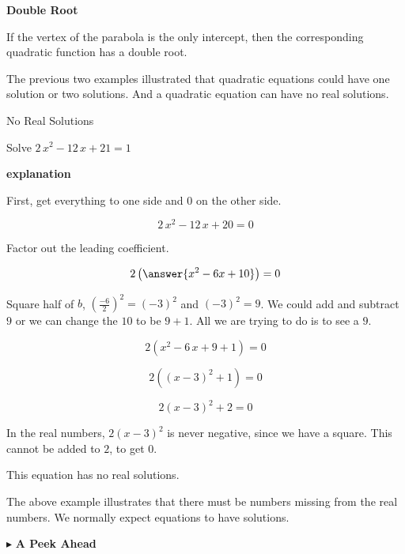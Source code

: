 \documentclass{ximera}
\begin{document}
\begin{idea} \textbf{\textcolor{blue!55!black}{Double Root}} 

If the vertex of the parabola is the only intercept, then the corresponding quadratic function has a double root.


\end{idea}



The previous two examples illustrated that quadratic equations could have one solution or two solutions.  And a quadratic equation can have no real solutions.










\begin{example} No Real Solutions

Solve $2 \, x^2 - 12 \, x + 21 = 1$ 


\textbf{\textcolor{red!75!green}{explanation}} 


First, get everything to one side and $0$ on the other side.



\[  2 \, x^2 - 12 \, x + 20 = 0  \]

Factor out the leading coefficient.

\[  2 \left( \answer{x^2 - 6x + 10} \right) = 0  \]


Square half of $b$, $\left(\frac{-6}{2}\right)^2 = (-3)^2$ and $(-3)^2 = 9$.  We could add and subtract $9$ or we can change the $10$ to be $9+1$.  All we are trying to do is to see a $9$.



\[  2 (x^2 - 6 \, x + 9 + 1) = 0  \]


\[  2 ((x-3)^2 + 1) = 0  \]


\[  2 (x-3)^2 + 2 = 0  \]

In the real numbers, $2 (x-3)^2$ is never negative, since we have a square.  This cannot be added to $2$, to get $0$.  


This equation has no real solutions.



\end{example}



The above example illustrates that there must be numbers missing from the real numbers.  We normally expect equations to have solutions. 


$\blacktriangleright$  \textbf{\textcolor{purple!85!blue}{A Peek Ahead}} 
\end{document}
